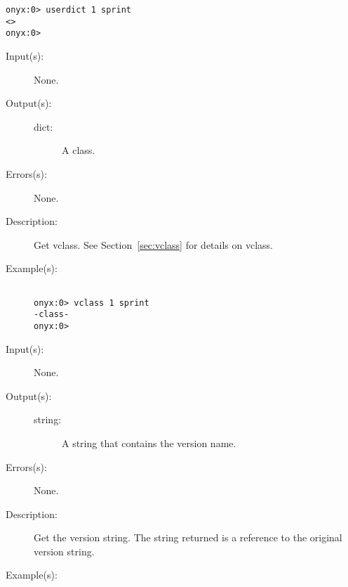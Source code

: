 \begin{description}
\begin{description}
\begin{verbatim}
onyx:0> userdict 1 sprint
<>
onyx:0>
		\end{verbatim}
	\end{description}
\label{systemdict:vclass}
\item[{\onyxop{--}{vclass}{class}}: ]
	\begin{description}\item[]
	\item[Input(s): ] None.
	\item[Output(s): ]
		\begin{description}\item[]
		\item[dict: ]
			A class.
		\end{description}
	\item[Errors(s): ] None.
	\item[Description: ]
		Get vclass.  See Section~\ref{sec:vclass} for details on vclass.
	\item[Example(s): ]\begin{verbatim}

onyx:0> vclass 1 sprint
-class-
onyx:0>
		\end{verbatim}
	\end{description}
\label{systemdict:version}
\item[{\onyxop{--}{version}{string}}: ]
	\begin{description}\item[]
	\item[Input(s): ] None.
	\item[Output(s): ]
		\begin{description}\item[]
		\item[string: ]
			A string that contains the version name.
		\end{description}
	\item[Errors(s): ] None.
	\item[Description: ]
		Get the version string.  The string returned is a reference to
		the original version string.
	\item[Example(s): ]\begin{verbatim}


\end{verbatim}
\end{description}
\end{description}
